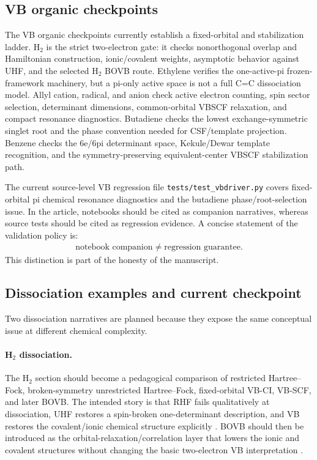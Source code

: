 \documentclass[11pt]{article}
\begin{document}
\subsection{VB organic checkpoints}

The VB organic checkpoints currently establish a fixed-orbital and stabilization ladder.  H$_2$ is the strict two-electron gate: it checks nonorthogonal overlap and Hamiltonian construction, ionic/covalent weights, asymptotic behavior against UHF, and the selected H$_2$ BOVB route.  Ethylene verifies the one-active-pi frozen-framework machinery, but a pi-only active space is not a full C=C dissociation model.  Allyl cation, radical, and anion check active electron counting, spin sector selection, determinant dimensions, common-orbital VBSCF relaxation, and compact resonance diagnostics.  Butadiene checks the lowest exchange-symmetric singlet root and the phase convention needed for CSF/template projection.  Benzene checks the 6e/6pi determinant space, Kekule/Dewar template recognition, and the symmetry-preserving equivalent-center VBSCF stabilization path.

The current source-level VB regression file \texttt{tests/test\_vbdriver.py} covers fixed-orbital pi chemical resonance diagnostics and the butadiene phase/root-selection issue.  In the article, notebooks should be cited as companion narratives, whereas source tests should be cited as regression evidence.  A concise statement of the validation policy is:
\begin{equation}
\begin{aligned}
	\text{notebook companion} \neq \text{regression guarantee}.
\end{aligned}
\end{equation}
This distinction is part of the honesty of the manuscript.

\subsection{Dissociation examples and current checkpoint}

Two dissociation narratives are planned because they expose the same conceptual issue at different chemical complexity.

\paragraph{H$_2$ dissociation.}
The H$_2$ section should become a pedagogical comparison of restricted Hartree--Fock, broken-symmetry unrestricted Hartree--Fock, fixed-orbital VB-CI, VB-SCF, and later BOVB.  The intended story is that RHF fails qualitatively at dissociation, UHF restores a spin-broken one-determinant description, and VB restores the covalent/ionic chemical structure explicitly \cite{ShaikHibertyVB}.  BOVB should then be introduced as the orbital-relaxation/correlation layer that lowers the ionic and covalent structures without changing the basic two-electron VB interpretation \cite{BOVB}.
\end{document}

